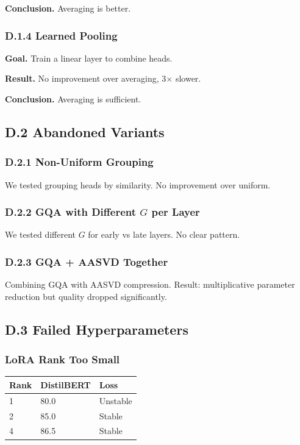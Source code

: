 \textbf{Conclusion.} Averaging is better.

\subsubsection{D.1.4 Learned Pooling}

\textbf{Goal.} Train a linear layer to combine heads.

\textbf{Result.} No improvement over averaging, 3$\times$ slower.

\textbf{Conclusion.} Averaging is sufficient.

\subsection{D.2 Abandoned Variants}

\subsubsection{D.2.1 Non-Uniform Grouping}

We tested grouping heads by similarity. No improvement over uniform.

\subsubsection{D.2.2 GQA with Different $G$ per Layer}

We tested different $G$ for early vs late layers. No clear pattern.

\subsubsection{D.2.3 GQA + AASVD Together}

Combining GQA with AASVD compression. Result: multiplicative parameter 
reduction but quality dropped significantly.

\subsection{D.3 Failed Hyperparameters}

\subsubsection{LoRA Rank Too Small}

\begin{table}[H]
\centering
\small
\begin{tabular}{lll}
\toprule
\textbf{Rank} & \textbf{DistilBERT} & \textbf{Loss} \\
\midrule
1 & 80.0 & Unstable \\
2 & 85.0 & Stable \\
4 & 86.5 & Stable \\
\bottomrule
\end{tabular}
\end{table}

